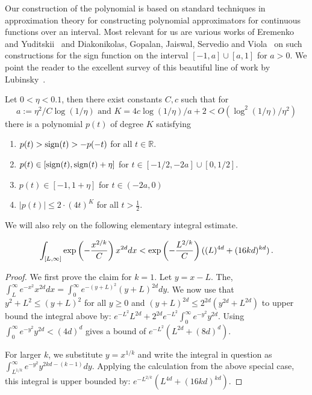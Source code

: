 Our construction of the polynomial is based on standard techniques in approximation theory for constructing polynomial approximators for continuous functions over an interval. Most relevant for us are various works of Eremenko and Yuditskii~\cite{MR2441914,MR2837087,MR2346548} and Diakonikolas, Gopalan, Jaiswal, Servedio and Viola~\cite{DGJSV09} on such constructions for the sign function on the interval $[-1,a] \cup [a,1]$ for $a >0$. We point the reader to the excellent survey of this beautiful line of work by Lubinsky~\cite{2007math......1099L}. 

\begin{fact}
\label{fact:boxpoly}
Let $0 < \eta < 0.1$, then there exist constants $C, c$ such that for 
\[ a:= \eta^2 / C\log(1/\eta)\text{ and }K = 4c\log(1/\eta)/a + 2 < O(\log^2(1/\eta)/\eta^2)\]
there is a polynomial $p(t)$ of degree $K$ satisfying 
\begin{enumerate}
    \item $p(t) > \operatorname{sign}(t) > -p(-t)$ for all $t \in \mathbb{R}$.
    \item $p(t) \in [\operatorname{sign}(t), \operatorname{sign}(t) + \eta]$ for $t \in [-1/2, -2a] \cup [0, 1/2]$.
    \item $p(t) \in [-1, 1+\eta]$ for $t \in (-2a, 0)$
    \item $|p(t)| \leq 2 \cdot (4t)^K$ for all $t > \frac{1}{2}$. 
\end{enumerate}
\end{fact}

We will  also rely on the following elementary integral estimate.
\begin{lemma} \label{lem:tail-estimate}
\[\int_{[L, \infty]} \exp\left(-\frac{x^{2/k}}{C}\right) x^{2d}  dx < \exp\left(-\frac{L^{2/k}}{C}\right) ((L)^{4d} + (16kd)^{kd}) \,. \]
\end{lemma}
\begin{proof}
We first prove the claim for $k =1$. 
Let $y = x-L$. The,  $\int_{L}^{\infty} e^{-x^2} x^{2d} dx = \int_{0}^{\infty} e^{-(y+L)^2} (y+L)^{2d} dy$.
We now use that $y^2 + L^2  \leq (y+L)^2$ for all $y \geq 0$ and $(y+L)^{2d} \leq 2^{2d} (y^{2d} + L^{2d})$ to upper bound the integral above by: $e^{-L^2} L^{2d}  + 2^{2d} e^{-L^2} \int_{0}^{\infty} e^{-y^2} y^{2d}$. Using $\int_{0}^{\infty} e^{-y^2} y^{2d} < (4d)^{d}$ gives a bound of $e^{-L^2} (L^{2d}+ (8d)^d)$. 

For larger $k$, we substitute $y = x^{1/k}$ and write the integral in question as $\int_{L^{1/k}}^{\infty} e^{-y^2} y^{2kd-(k-1)} dy$. 
Applying the calculation from the above special case, this integral is upper bounded by: $e^{-L^{2/k}} (L^{4d} + (16kd)^{kd})$.
\end{proof}






